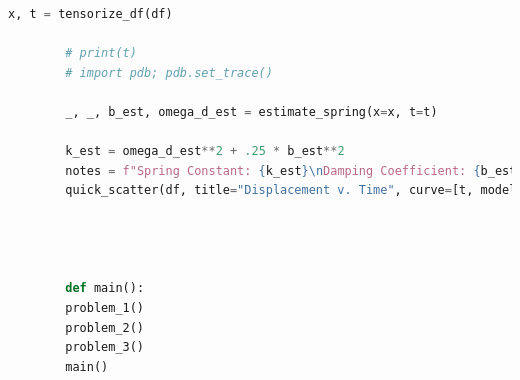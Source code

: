 \documentclass[]{report}
\begin{document}
\begin{lstlisting}[language=Python]
		x, t = tensorize_df(df)
		
		# print(t)
		# import pdb; pdb.set_trace()
		
		_, _, b_est, omega_d_est = estimate_spring(x=x, t=t)
		
		k_est = omega_d_est**2 + .25 * b_est**2
		notes = f"Spring Constant: {k_est}\nDamping Coefficient: {b_est}"
		quick_scatter(df, title="Displacement v. Time", curve=[t, model(t, *estimate_spring(x, t))], text=notes)
		
		
		
		
		def main():
		problem_1()
		problem_2()
		problem_3()
		main()
		
		
		
	\end{lstlisting}
	
\end{document}
